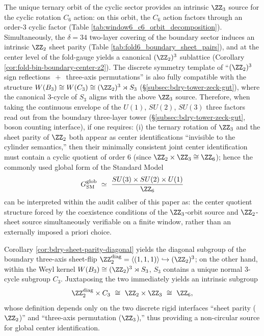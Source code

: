 \begin{corollary}[Minimal Consistent Global Center Identification: \texorpdfstring{$\ZZ_2\times\ZZ_3\cong\ZZ_6$}{Z2xZ3=Z6}]\label{cor:bdry-global-z6-quotient}
The unique ternary orbit of the cyclic sector provides an intrinsic \(\ZZ_3\) source for the cyclic rotation \(C_6\) action: on this orbit, the \(C_6\) action factors through an order-\(3\) cyclic factor (Table \ref{tab:window6_c6_orbit_decomposition}).
Simultaneously, the \(\delta=34\) two-layer covering of the boundary sector induces an intrinsic \(\ZZ_2\) sheet parity (Table \ref{tab:fold6_boundary_sheet_pairs}), and at the center level of the fold-gauge yields a canonical \((\ZZ_2)^3\) sublattice (Corollary \ref{cor:fold-bin-boundary-center-z2}).
The discrete symmetry template of ``\((\ZZ_2)^3\) sign reflections \(\,+\,\) three-axis permutations'' is also fully compatible with the structure \(W(B_3)\cong W(C_3)\cong (\ZZ_2)^3\rtimes S_3\) (\S\ref{subsec:bdry-tower-zeck-gut}), where the canonical \(3\)-cycle of \(S_3\) aligns with the above \(\ZZ_3\) source.
Therefore, when taking the continuous envelope of the \(U(1)\), \(SU(2)\), \(SU(3)\) three factors read out from the boundary three-layer tower (\S\ref{subsec:bdry-tower-zeck-gut}, boson counting interface), if one requires:
(i) the ternary rotation of \(\ZZ_3\) and the sheet parity of \(\ZZ_2\) both appear as center identifications ``invisible to the cylinder semantics,''
then their minimally consistent joint center identification must contain a cyclic quotient of order \(6\) (since \(\ZZ_2\times\ZZ_3\cong\ZZ_6\));
hence the commonly used global form of the Standard Model
\[
G_{\mathrm{SM}}^{\mathrm{glob}}
\ \simeq\
\frac{SU(3)\times SU(2)\times U(1)}{\ZZ_6}
\]
can be interpreted within the audit caliber of this paper as: the center quotient structure forced by the coexistence conditions of the \(\ZZ_3\)-orbit source and \(\ZZ_2\)-sheet source simultaneously verifiable on a finite window, rather than an externally imposed a priori choice.
\end{corollary}

\begin{remark}\label{rem:bdry-intrinsic-z6-diagz2-c3}
Corollary \ref{cor:bdry-sheet-parity-diagonal} yields the diagonal subgroup of the boundary three-axis sheet-flip
\(
\ZZ_2^{\mathrm{diag}}=\langle(1,1,1)\rangle\hookrightarrow (\ZZ_2)^3
\);
on the other hand, within the Weyl kernel \(W(B_3)\cong (\ZZ_2)^3\rtimes S_3\), \(S_3\) contains a unique normal \(3\)-cycle subgroup \(C_3\).
Juxtaposing the two immediately yields an intrinsic subgroup
\[
\ZZ_2^{\mathrm{diag}}\times C_3\ \cong\ \ZZ_2\times\ZZ_3\ \cong\ \ZZ_6,
\]
whose definition depends only on the two discrete rigid interfaces ``sheet parity (\(\ZZ_2\))'' and ``three-axis permutation (\(\ZZ_3\)),'' thus providing a non-circular source for global center identification.
\end{remark}

